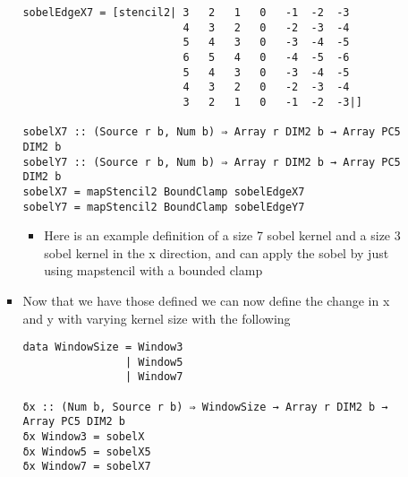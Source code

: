 \documentclass{article}
\begin{document}
\begin{enumerate}
\begin{enumerate}
\begin{itemize}
\begin{verbatim}
sobelEdgeX7 = [stencil2| 3   2   1   0   -1  -2  -3
                         4   3   2   0   -2  -3  -4
                         5   4   3   0   -3  -4  -5
                         6   5   4   0   -4  -5  -6
                         5   4   3   0   -3  -4  -5
                         4   3   2   0   -2  -3  -4
                         3   2   1   0   -1  -2  -3|]

sobelX7 :: (Source r b, Num b) ⇒ Array r DIM2 b → Array PC5 DIM2 b
sobelY7 :: (Source r b, Num b) ⇒ Array r DIM2 b → Array PC5 DIM2 b
sobelX7 = mapStencil2 BoundClamp sobelEdgeX7
sobelY7 = mapStencil2 BoundClamp sobelEdgeY7
\end{verbatim}
\begin{itemize}
\item Here is an example definition of a size 7 sobel kernel and a size 3
sobel kernel in the x direction, and can apply the sobel by just
using mapstencil with a bounded clamp
\end{itemize}

\item Now that we have those defined we can now define the change in x and y
with varying kernel size with the following
\begin{verbatim}
data WindowSize = Window3
                | Window5
                | Window7

δx :: (Num b, Source r b) ⇒ WindowSize → Array r DIM2 b → Array PC5 DIM2 b
δx Window3 = sobelX
δx Window5 = sobelX5
δx Window7 = sobelX7


\end{verbatim}
\end{itemize}
\end{enumerate}
\end{enumerate}
\end{document}
